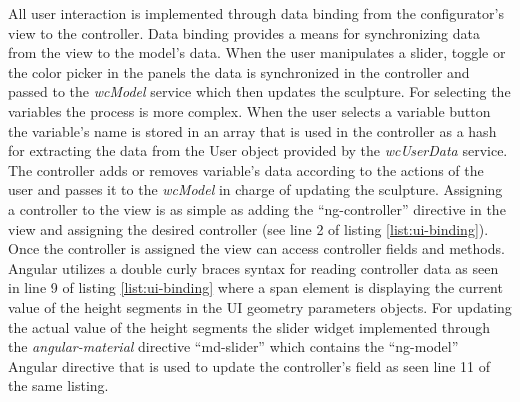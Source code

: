 \documentclass[../medieninformatik-arbeit.tex]{subfiles}
\begin{document}
All user interaction is implemented through data binding from the configurator's view to the controller. Data binding provides a means for synchronizing data from the view to the model's data. When the user manipulates a slider, toggle or the color picker in the panels the data is synchronized in the controller and passed to the \textit{wcModel} service which then updates the sculpture. For selecting the variables the process is more complex. When the user selects a variable button the variable's name is stored in an array that is used in the controller as a hash for extracting the data from the User object provided by the \textit{wcUserData} service. The controller adds or removes variable's data according to the actions of the user and passes it to the \textit{wcModel} in charge of updating the sculpture. Assigning a controller to the view is as simple as adding the ``ng-controller'' directive in the view and assigning the desired controller (see line 2 of listing \ref{list:ui-binding}). Once the controller is assigned the view can access controller fields and methods. Angular utilizes a double curly braces syntax for reading controller data as seen in line 9 of listing \ref{list:ui-binding} where a span element is displaying the current value of the height segments in the UI geometry parameters objects. For updating the actual value of the height segments the slider widget implemented through the \textit{angular-material} directive ``md-slider'' which contains the ``ng-model'' Angular directive that is used to update the controller's field as seen line 11 of the same listing. 
\end{document}
